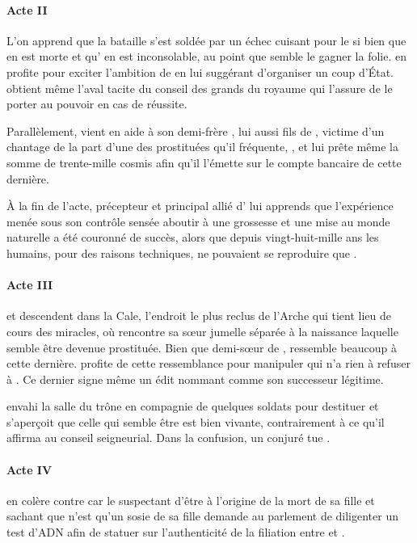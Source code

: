 \paragraph{Acte II}
L’on apprend que la bataille s’est soldée par un échec cuisant pour le \campprincipal{} si bien que \princesse{} en est morte et qu’\roi{} en est inconsolable, au point que semble le gagner la folie. \elena{} en profite pour exciter l’ambition de \general{} en lui suggérant d’organiser un coup d’État. \general{} obtient même l’aval tacite du conseil des grands du royaume qui l’assure de le porter au pouvoir en cas de réussite.

Parallèlement, \elena{} vient en aide à son demi-frère \vladimir{}, lui aussi fils de \reine{}, victime d’un chantage de la part d’une des prostituées qu’il fréquente, \catin, et lui prête même la somme de trente-mille cosmis afin qu’il l’émette sur le compte bancaire de cette dernière.

À la fin de l’acte, \alexas{} précepteur et principal allié d’\elena{} lui apprends que l’expérience menée sous son contrôle sensée aboutir à une grossesse et une mise au monde naturelle a été couronné de succès, alors que depuis vingt-huit-mille ans les humains, pour des raisons techniques, ne pouvaient se reproduire que .


\paragraph{Acte III}
\elena{} et \alexas{} descendent dans la Cale, l’endroit le plus reclus de l’Arche qui tient lieu de cours des miracles, où \elena{} rencontre \ela{} sa sœur jumelle séparée à la naissance laquelle semble être devenue prostituée. Bien que demi-sœur de \princesse{}, \ela{} ressemble beaucoup à cette dernière. \elena{} profite de cette ressemblance pour manipuler \roi{} qui n’a rien à refuser à \ela{}. Ce dernier signe même un édit nommant \elena{} comme son successeur légitime.

\general{} envahi la salle du trône en compagnie de quelques soldats pour destituer \roi{} et s’aperçoit que celle qui semble être \princesse{} est bien vivante, contrairement à ce qu’il affirma au conseil seigneurial. Dans la confusion, un conjuré tue \general{}.

\paragraph{Acte IV}
\reine{} en colère contre \elena{} car le suspectant d’être à l’origine de la mort de sa fille et sachant que \ela{} n’est qu’un sosie de sa fille \princesse{} demande au parlement de diligenter un test d’ADN afin de statuer sur l’authenticité de la filiation entre \roi{} et \ela{}.

